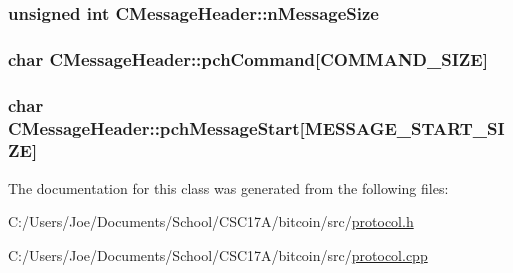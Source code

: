 \subsubsection[{n\+Message\+Size}]{\setlength{\rightskip}{0pt plus 5cm}unsigned int C\+Message\+Header\+::n\+Message\+Size}\label{class_c_message_header_a67ccb9f1f23af69e309a8d6c8bfff751}
\hypertarget{class_c_message_header_a87d62b0d9afb3889f318991700a34431}{}
\subsubsection[{pch\+Command}]{\setlength{\rightskip}{0pt plus 5cm}char C\+Message\+Header\+::pch\+Command\mbox{[}{\bf C\+O\+M\+M\+A\+N\+D\+\_\+\+S\+I\+Z\+E}\mbox{]}}\label{class_c_message_header_a87d62b0d9afb3889f318991700a34431}
\hypertarget{class_c_message_header_a4284bf1d2fd792af89e1c93b7e6e274e}{}
\subsubsection[{pch\+Message\+Start}]{\setlength{\rightskip}{0pt plus 5cm}char C\+Message\+Header\+::pch\+Message\+Start\mbox{[}{\bf M\+E\+S\+S\+A\+G\+E\+\_\+\+S\+T\+A\+R\+T\+\_\+\+S\+I\+Z\+E}\mbox{]}}\label{class_c_message_header_a4284bf1d2fd792af89e1c93b7e6e274e}


The documentation for this class was generated from the following files\+:\begin{DoxyCompactItemize}
\item 
C\+:/\+Users/\+Joe/\+Documents/\+School/\+C\+S\+C17\+A/bitcoin/src/\hyperlink{protocol_8h}{protocol.\+h}\item 
C\+:/\+Users/\+Joe/\+Documents/\+School/\+C\+S\+C17\+A/bitcoin/src/\hyperlink{protocol_8cpp}{protocol.\+cpp}\end{DoxyCompactItemize}
